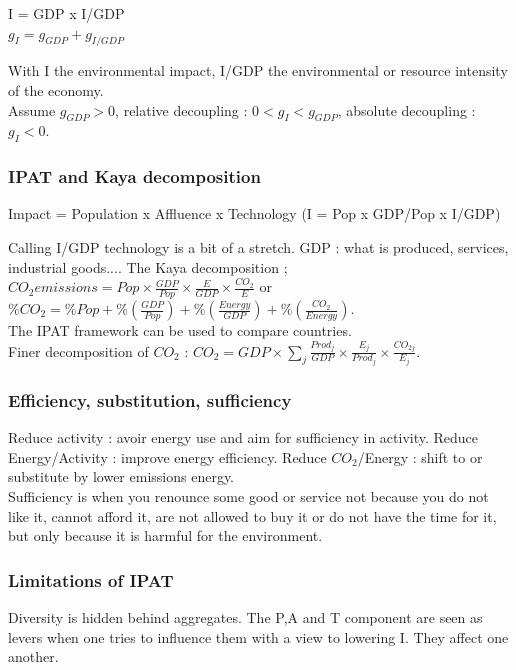 \documentclass[../main.tex]{subfiles}
\begin{document}
\begin{center}
    I = GDP x I/GDP\\
    $g_I = g_{GDP} + g_{I/GDP}$
\end{center}
With I the environmental impact, I/GDP the environmental or resource intensity of the economy.\\
Assume $g_{GDP} >0$, relative decoupling : $0<g_I<g_{GDP}$, absolute decoupling : $g_I < 0$.\\

\subsubsection{IPAT and Kaya decomposition}
\begin{center}
    Impact = Population x Affluence x Technology (I = Pop x GDP/Pop x I/GDP)
\end{center}
Calling I/GDP technology is a bit of a stretch. GDP : what is produced, services, industrial goods....
The Kaya decomposition ; $CO_2 emissions = Pop\times \frac{GDP}{Pop} \times \frac{E}{GDP} \times \frac{CO_2}{E}$ or $\% CO_2 = \% Pop + \% (\frac{GDP}{Pop}) + \% (\frac{Energy}{GDP}) + \%(\frac{CO_2}{Energy})$.\\
The IPAT framework can be used to compare countries. \\
Finer decomposition of $CO_2$ : $CO_2 = GDP \times \sum_j \frac{Prod_j}{GDP} \times \frac{E_j}{Prod_j} \times \frac{CO_{2j}}{E_j}$.\\

\subsubsection{Efficiency, substitution, sufficiency}
Reduce activity : avoir energy use and aim for sufficiency in activity. Reduce Energy/Activity : improve energy efficiency. Reduce $CO_2$/Energy : shift to or substitute by lower emissions energy.\\

Sufficiency is when you renounce some good or service not because you do not like it, cannot afford it, are not allowed to buy it or do not have the time for it, but only because it is harmful for the environment.

\subsubsection{Limitations of IPAT}
Diversity is hidden behind aggregates. The P,A and T component are seen as levers when one tries to influence them with a view to lowering I. They affect one another.\\
\end{document}
